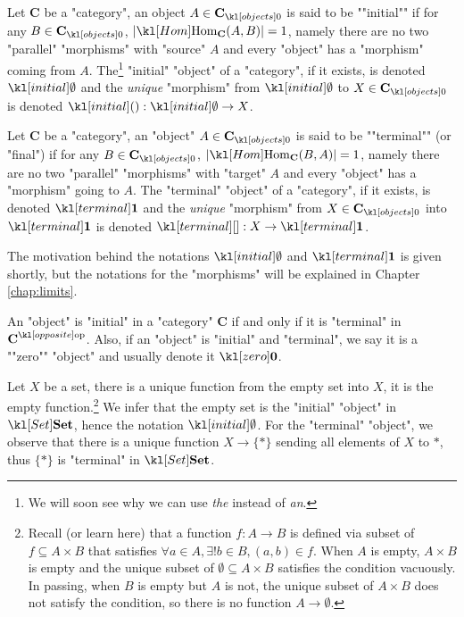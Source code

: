 \documentclass[main.tex]{subfiles}
\begin{document}
\begin{defn}
	\AP Let $\mathbf{C}$ be a "category", an object $A \in \obj{\mathbf{C}}$ is said to be ""initial"" if for any $B \in \obj{\mathbf{C}}$, $|\Hom_{\mathbf{C}}(A,B)| = 1$, namely there are no two "parallel" "morphisms" with "source" $A$ and every "object" has a "morphism" coming from $A$. The\footnote{We will soon see why we can use \textit{the} instead of \textit{an}.} "initial" "object" of a "category", if it exists, is denoted $\initial$ and the \textit{unique} "morphism" from $\initial$ to $X\in \obj{\mathbf{C}}$ is denoted $\initmorph: \initial \rightarrow X$.
\end{defn}
\begin{defn}
	\AP Let $\mathbf{C}$ be a "category", an "object" $A \in \obj{\mathbf{C}}$ is said to be ""terminal"" (or "final") if for any $B \in \obj{\mathbf{C}}$, $|\Hom_{\mathbf{C}}(B,A)| = 1$, namely there are no two "parallel" "morphisms" with "target" $A$ and every "object" has a "morphism" going to $A$. The "terminal" "object" of a "category", if it exists, is denoted $\terminal$ and the \textit{unique} "morphism" from $X \in \obj{\mathbf{C}}$ into $\terminal$ is denoted $\termmorph:X \rightarrow \terminal$.
\end{defn}
\begin{rem}[Notation]
	The motivation behind the notations $\initial$ and $\terminal$ is given shortly, but the notations for the "morphisms" will be explained in Chapter \ref{chap:limits}.
\end{rem}
An "object" is "initial" in a "category" $\mathbf{C}$ if and only if it is "terminal" in $\op{\mathbf{C}}$. \AP Also, if an "object" is "initial" and "terminal", we say it is a ""zero"" "object" and usually denote it $\zero$.
\begin{exmp}[$\catSet$]
	Let $X$ be a set, there is a unique function from the empty set into $X$, it is the empty function.\footnote{Recall (or learn here) that a function $f: A \rightarrow B$ is defined via subset of $f \subseteq A \times B$ that satisfies $\forall a \in A, \exists! b\in B, (a,b) \in f$. When $A$ is empty, $A \times B$ is empty and the unique subset of $\emptyset \subseteq A\times B$ satisfies the condition vacuously. In passing, when $B$ is empty but $A$ is not, the unique subset of $A \times B$ does not satisfy the condition, so there is no function $A \rightarrow \emptyset$.} We infer that the empty set is the "initial" "object" in $\catSet$, hence the notation $\initial$. For the "terminal" "object", we observe that there is a unique function $X \rightarrow \{\ast\}$ sending all elements of $X$ to $\ast$, thus $\{\ast\}$ is "terminal" in $\catSet$.
\end{exmp}
\end{document}

